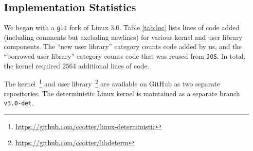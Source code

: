 \subsection{Implementation Statistics}
We began with a {\tt git} fork of Linux 3.0. Table \ref{tab:loc} lists lines
of code added (including comments but excluding newlines) for various kernel and
user library components. The ``new user library'' category counts code added by
us, and the ``borrowed user library'' category counts code that was reused from
{\tt JOS}. In total, the kernel required 2564 additional lines of code.



The kernel~\footnote{
\url{https://github.com/ccotter/linux-deterministic}} and user
library~\footnote{\url{https://github.com/ccotter/libdeterm}} are available on
GitHub as two separate repositories. The deterministic Linux kernel
is maintained as a separate branch {\tt v3.0-det}.

\endinput

	\begin{itemize}
	\end{itemize}

